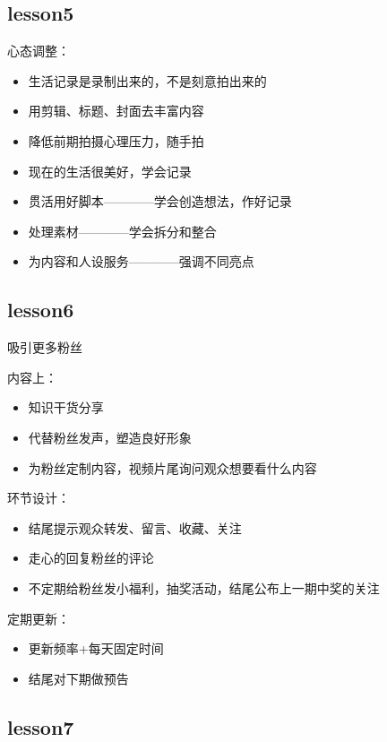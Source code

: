 \documentclass{book}
\begin{document}
\subsection{lesson5}

心态调整：\begin{itemize}
       \item 生活记录是录制出来的，不是刻意拍出来的
       \item 用剪辑、标题、封面去丰富内容
       \item 降低前期拍摄心理压力，随手拍
       \item 现在的生活很美好，学会记录
     \end{itemize}

\begin{itemize}
  \item 贯活用好脚本————学会创造想法，作好记录
  \item 处理素材————学会拆分和整合
  \item 为内容和人设服务————强调不同亮点
\end{itemize}

\subsection{lesson6}

吸引更多粉丝

内容上：\begin{itemize}
      \item 知识干货分享
      \item 代替粉丝发声，塑造良好形象
      \item 为粉丝定制内容，视频片尾询问观众想要看什么内容
    \end{itemize}

环节设计：\begin{itemize}
       \item 结尾提示观众转发、留言、收藏、关注
       \item 走心的回复粉丝的评论
       \item 不定期给粉丝发小福利，抽奖活动，结尾公布上一期中奖的关注
     \end{itemize}

定期更新：\begin{itemize}
       \item 更新频率+每天固定时间
       \item 结尾对下期做预告
     \end{itemize}

\subsection{lesson7}
\end{document}

